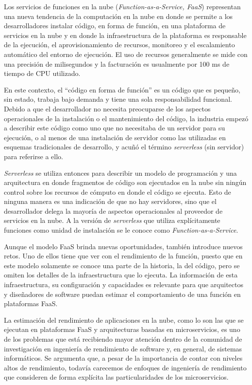 Los servicios de funciones en la nube (\textit{Function-as-a-Service, FaaS}) representan una nueva tendencia de la computación en la nube en donde se permite a los desarrolladores instalar código, en forma de función, en una plataforma de servicios en la nube y en donde la infraestructura de la plataforma es responsable de la ejecución, el aprovisionamiento de recursos, monitoreo y el escalamiento automático del entorno de ejecución. El uso de recursos generalmente se mide con una precisión de milisegundos y la facturación es usualmente por 100 ms de tiempo de CPU utilizado. 

En este contexto, el ``código en forma de función'' es un código que es pequeño, sin estado, trabaja bajo demanda y tiene una sola responsabilidad funcional. Debido a que el desarrollador no necesita preocuparse de los aspectos operacionales de la instalación o el mantenimiento del código, la industria empezó a describir este código como uno que no necesitaba de un servidor para su ejecución, o al menos de una instalación de servidor como las utilizadas en esquemas tradicionales de desarrollo, y acuñó el término \textit{serverless} (sin servidor) para referirse a ello. 

\textit{Serverless} se utiliza entonces para describir un modelo de programación y una arquitectura en donde fragmentos de código son ejecutados en la nube sin ningún control sobre los recursos de cómputo en donde el código se ejecuta. Esto de ninguna manera es una indicación de que no hay servidores, sino que el desarrollador delega la mayoría de aspectos operacionales al proveedor de servicios en la nube. A la versión de \textit{serverless} que utiliza explícitamente funciones como unidad de instalación se le conoce como \textit{Function-as-a-Service}\cite{DBLP:journals/corr/BaldiniCCCFIMMR17}.

Aunque el modelo FaaS brinda nuevas oportunidades, también introduce nuevos retos. Uno de ellos tiene que ver con el rendimiento de la función, puesto que en este modelo solamente se conoce una parte de la historia, la del código, pero se omiten los detalles de la infraestructura que lo ejecuta. La información de esta infraestructura, su configuración y capacidades es relevante para que arquitectos y diseñadores de software puedan estimar el comportamiento de una función en plataformas FaaS. 

La estimación del rendimiento de aplicaciones en la nube, como lo son las que se ejecutan en plataformas FaaS y arquitecturas basadas en microservicios, es uno de los problemas que está recibiendo mayor atención dentro de la comunidad de investigación en ingeniería de rendimiento de software y, en general, de sistemas informáticos. Se argumenta que, a pesar de la importancia de contar con niveles altos de rendimiento, todavía carecemos de enfoques de ingeniería de rendimiento que consideren de forma explícita las particularidades de los microservicios\cite{Heinrich:2017:PEM:3053600.3053653}.

